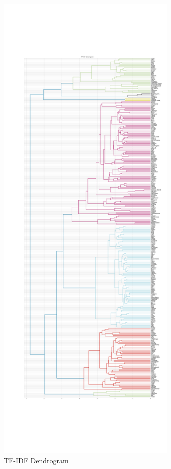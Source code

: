 \documentclass[5p,authoryear]{elsarticle}
\begin{document}
\begin{figure}[!htb] \centering
	\includegraphics[width=3.4in]{figures/tfidf_dendrogram.png}
	\caption[]{TF-IDF Dendrogram} 
	\label{TF-IDFDendrogram} 
\end{figure}


\clearpage





\end{document}
